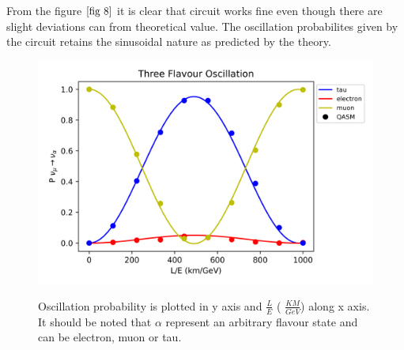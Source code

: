 \documentclass[12pt,a4paper]{report}
\begin{document}
From the figure $\ref*{fig 8}$ it is clear that circuit works fine even though there are slight deviations can from theoretical value. The oscillation probabilites given by the circuit retains the sinusoidal nature as predicted by the theory.
\begin{figure}[H]
	\graphicspath{ {./Images/} }	
	{\includegraphics[width=\textwidth]{fig_8.png}}
	\centering\caption{ Oscillation probability is plotted in y axis and $\frac{L}{E}$ ( $\frac{KM}{GeV}$) along x axis. It should be noted that $\alpha$ represent an arbitrary flavour state and can be electron, muon or tau.}
		\label{fig 8}
	\end{figure}
\end{document}
